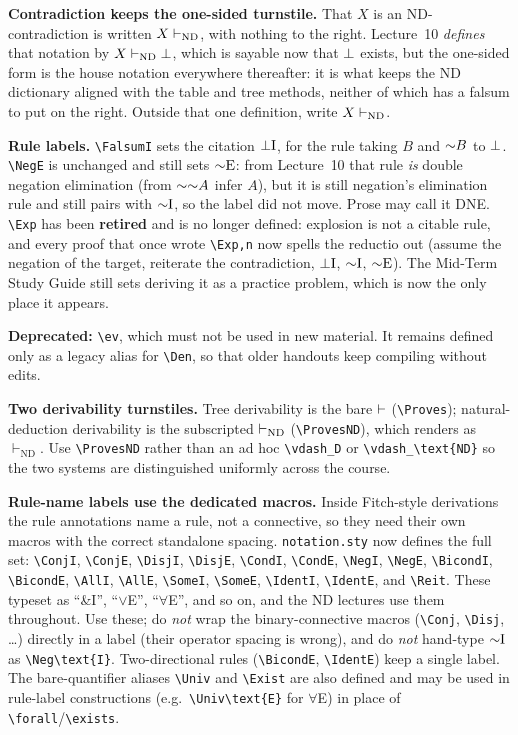 \documentclass[11pt]{article}
\begin{document}
\noindent
\textbf{Contradiction keeps the one-sided turnstile.} That $X$ is an ND-contradiction is written $X \vdash_{\mathrm{ND}}$, with nothing to the right. Lecture~10 \emph{defines} that notation by $X \vdash_{\mathrm{ND}} \bot$, which is sayable now that $\bot$ exists, but the one-sided form is the house notation everywhere thereafter: it is what keeps the ND dictionary aligned with the table and tree methods, neither of which has a falsum to put on the right. Outside that one definition, write $X \vdash_{\mathrm{ND}}$.

\noindent
\textbf{Rule labels.} \verb|\FalsumI| sets the citation $\mathord{\bot}\text{I}$, for the rule taking $B$ and $\mathord{\sim} B$ to $\bot$. \verb|\NegE| is unchanged and still sets $\mathord{\mathord{\sim}}\text{E}$: from Lecture~10 that rule \emph{is} double negation elimination (from $\mathord{\sim}\mathord{\sim} A$ infer $A$), but it is still negation's elimination rule and still pairs with $\mathord{\mathord{\sim}}\text{I}$, so the label did not move. Prose may call it DNE. \verb|\Exp| has been \textbf{retired} and is no longer defined: explosion is not a citable rule, and every proof that once wrote \verb|\Exp,n| now spells the reductio out (assume the negation of the target, reiterate the contradiction, $\mathord{\bot}\text{I}$, $\mathord{\mathord{\sim}}\text{I}$, $\mathord{\mathord{\sim}}\text{E}$). The Mid-Term Study Guide still sets deriving it as a practice problem, which is now the only place it appears.

\medskip
\noindent
\textbf{Deprecated:} \verb|\ev|, which must not be used in new material. It remains defined only as a legacy alias for \verb|\Den|, so that older handouts keep compiling without edits.

\medskip
\noindent
\textbf{Two derivability turnstiles.} Tree derivability is the bare $\vdash$ (\verb|\Proves|); natural-deduction derivability is the subscripted $\vdash_{\mathrm{ND}}$ (\verb|\ProvesND|), which renders as $\vdash_{\mathrm{ND}}$. Use \verb|\ProvesND| rather than an ad hoc \verb|\vdash_D| or \verb|\vdash_\text{ND}| so the two systems are distinguished uniformly across the course.

\medskip
\noindent
\textbf{Rule-name labels use the dedicated macros.} Inside Fitch-style derivations the rule annotations name a rule, not a connective, so they need their own macros with the correct standalone spacing. \texttt{notation.sty} now defines the full set: \verb|\ConjI|, \verb|\ConjE|, \verb|\DisjI|, \verb|\DisjE|, \verb|\CondI|, \verb|\CondE|, \verb|\NegI|, \verb|\NegE|, \verb|\BicondI|, \verb|\BicondE|, \verb|\AllI|, \verb|\AllE|, \verb|\SomeI|, \verb|\SomeE|, \verb|\IdentI|, \verb|\IdentE|, and \verb|\Reit|. These typeset as ``\&I'', ``$\vee$E'', ``$\forall$E'', and so on, and the ND lectures use them throughout. Use these; do \emph{not} wrap the binary-connective macros (\verb|\Conj|, \verb|\Disj|, \dots) directly in a label (their operator spacing is wrong), and do \emph{not} hand-type $\mathord{\sim}\text{I}$ as \verb|\Neg\text{I}|. Two-directional rules (\verb|\BicondE|, \verb|\IdentE|) keep a single label. The bare-quantifier aliases \verb|\Univ| and \verb|\Exist| are also defined and may be used in rule-label constructions (e.g.\ \verb|\Univ\text{E}| for $\forall$E) in place of \verb|\forall|/\verb|\exists|.
\end{document}
